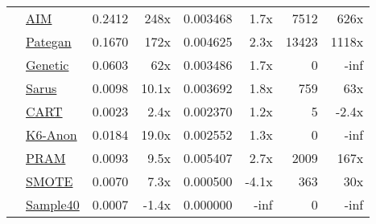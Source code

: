 \begin{table}
\begin{tabular}{llr@{\hskip 6pt}r@{\hskip 14pt}r@{\hskip 6pt}r@{\hskip 14pt}rr}
        \cellcolor{ForestGreen} & \href{https://htmlpreview.github.io/?https://github.com/yoid2000/sdnist-summary/blob/main/results/aim_e_10_all/report.html}{AIM} & 0.2412 & 248x & 0.003468 & 1.7x & 7512 & 626x \\
        \cellcolor{ForestGreen} & \href{https://htmlpreview.github.io/?https://github.com/yoid2000/sdnist-summary/blob/main/results/pategan_n_iter_50_e_10_all/report.html}{Pategan} & 0.1670 & 172x & 0.004625 & 2.3x & 13423 & 1118x \\
        \cellcolor{YellowGreen} & \href{https://htmlpreview.github.io/?https://github.com/yoid2000/sdnist-summary/blob/main/results/genetic_sd_e_10_simple/report.html}{Genetic} & 0.0603 & 62x & 0.003486 & 1.7x & 0 & -inf \\
        \cellcolor{YellowGreen} & \href{https://htmlpreview.github.io/?https://github.com/yoid2000/sdnist-summary/blob/main/results/sarus_sdg_demographic/report.html}{Sarus} & 0.0098 & 10.1x & 0.003692 & 1.8x & 759 & 63x \\
        \cellcolor{SkyBlue} & \href{https://htmlpreview.github.io/?https://github.com/yoid2000/sdnist-summary/blob/main/results/cart_cf21/report.html}{CART} & 0.0023 & 2.4x & 0.002370 & 1.2x & 5 & -2.4x \\
        \cellcolor{Salmon} & \href{https://htmlpreview.github.io/?https://github.com/yoid2000/sdnist-summary/blob/main/results/k_anonymity_k_6/report.html}{K6-Anon} & 0.0184 & 19.0x & 0.002552 & 1.3x & 0 & -inf \\
        \cellcolor{Goldenrod} & \href{https://htmlpreview.github.io/?https://github.com/yoid2000/sdnist-summary/blob/main/results/pram_default/report.html}{PRAM} & 0.0093 & 9.5x & 0.005407 & 2.7x & 2009 & 167x \\
        \cellcolor{Tan} & \href{https://htmlpreview.github.io/?https://github.com/yoid2000/sdnist-summary/blob/main/results/smote_target_marital/report.html}{SMOTE} & 0.0070 & 7.3x & 0.000500 & -4.1x & 363 & 30x \\
        \cellcolor{Sepia} & \href{https://htmlpreview.github.io/?https://github.com/yoid2000/sdnist-summary/blob/main/results/subsample_40pcnt_all/report.html}{Sample40} & 0.0007 & -1.4x & 0.000000 & -inf & 0 & -inf \\
        \bottomrule
    \end{tabular}
\end{table}
